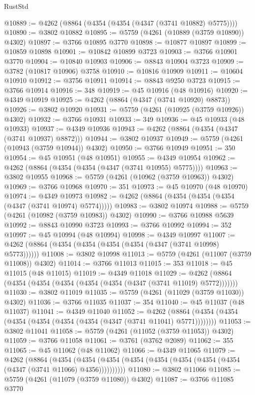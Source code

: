 \begin{lexlean}{RustStd}
\begin{coremodule}
@10889 := @4262 (@8864 (@4354 (@4354 (@4347 (@3741 @10882) @5775))))
@10890 := @3802 @10882
@10895 := @5759 (@4261 (@10889 (@3759 @10890)) @4302)
@10897 := @3766 @10895 @3770
@10898 := @10877 @10897
@10899 := @10859 @10898
@10901 := @10842 @10899 @3723
@10903 := @3766 @10901 @3770
@10904 := @10840 @10903
@10906 := @8843 @10904 @3723
@10909 := @3782 (@10817 @10906) @3758
@10910 := @10816 @10909
@10911 := @10604 @10910
@10912 := @3756 @10911
@10914 := @8843 @9250 @3723
@10915 := @3766 @10914
@10916 := 348
@10919 := @45 @10916 (@48 @10916)
@10920 := @4349 @10919
@10925 := @4262 (@8864 (@4347 (@3741 @10920) @8873))
@10926 := @3802 @10920
@10931 := @5759 (@4261 (@10925 (@3759 @10926)) @4302)
@10932 := @3766 @10931
@10933 := 349
@10936 := @45 @10933 (@48 @10933)
@10937 := @4349 @10936
@10943 := @4262 (@8864 (@4354 (@4347 (@3741 @10937) @8872)))
@10944 := @3802 @10937
@10949 := @5759 (@4261 (@10943 (@3759 @10944)) @4302)
@10950 := @3766 @10949
@10951 := 350
@10954 := @45 @10951 (@48 @10951)
@10955 := @4349 @10954
@10962 := @4262 (@8864 (@4354 (@4354 (@4347 (@3741 @10955) @5775))))
@10963 := @3802 @10955
@10968 := @5759 (@4261 (@10962 (@3759 @10963)) @4302)
@10969 := @3766 @10968
@10970 := 351
@10973 := @45 @10970 (@48 @10970)
@10974 := @4349 @10973
@10982 := @4262 (@8864 (@4354 (@4354 (@4354 (@4347 (@3741 @10974) @5774)))))
@10983 := @3802 @10974
@10988 := @5759 (@4261 (@10982 (@3759 @10983)) @4302)
@10990 := @3766 @10988 @5639
@10992 := @8843 @10990 @3723
@10993 := @3766 @10992
@10994 := 352
@10997 := @45 @10994 (@48 @10994)
@10998 := @4349 @10997
@11007 := @4262 (@8864 (@4354 (@4354 (@4354 (@4354 (@4347 (@3741 @10998) @5773))))))
@11008 := @3802 @10998
@11013 := @5759 (@4261 (@11007 (@3759 @11008)) @4302)
@11014 := @3766 @11013
@11015 := 353
@11018 := @45 @11015 (@48 @11015)
@11019 := @4349 @11018
@11029 := @4262 (@8864 (@4354 (@4354 (@4354 (@4354 (@4354 (@4347 (@3741 @11019) @5772)))))))
@11030 := @3802 @11019
@11035 := @5759 (@4261 (@11029 (@3759 @11030)) @4302)
@11036 := @3766 @11035
@11037 := 354
@11040 := @45 @11037 (@48 @11037)
@11041 := @4349 @11040
@11052 := @4262 (@8864 (@4354 (@4354 (@4354 (@4354 (@4354 (@4354 (@4347 (@3741 @11041) @5771))))))))
@11053 := @3802 @11041
@11058 := @5759 (@4261 (@11052 (@3759 @11053)) @4302)
@11059 := @3766 @11058
@11061 := @3761 (@3762 @2089)
@11062 := 355
@11065 := @45 @11062 (@48 @11062)
@11066 := @4349 @11065
@11079 := @4262
    (@8864
      (@4354 (@4354 (@4354 (@4354 (@4354 (@4354 (@4354 (@4354 (@4347 (@3741 @11066) @4356))))))))))
@11080 := @3802 @11066
@11085 := @5759 (@4261 (@11079 (@3759 @11080)) @4302)
@11087 := @3766 @11085 @3770

\end{coremodule}
\end{lexlean}
